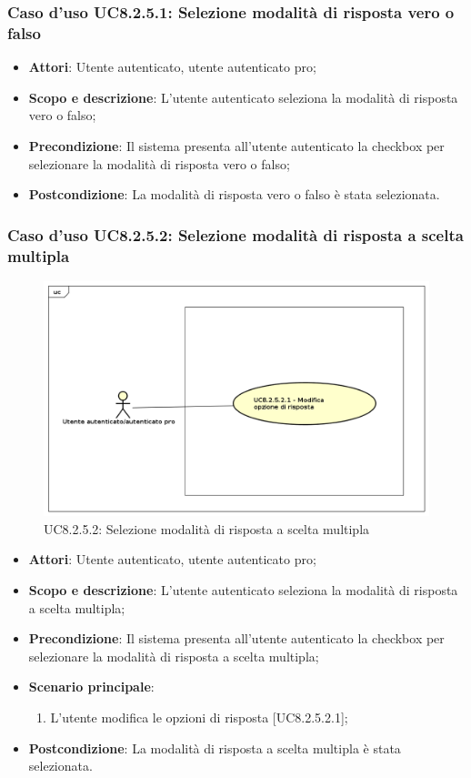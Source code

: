 	\subsubsection{Caso d'uso UC8.2.5.1: Selezione modalità di risposta vero o falso}
	\begin{itemize}
		\item
			\textbf{Attori}: Utente autenticato, utente autenticato pro;
		\item
			\textbf{Scopo e descrizione}: L'utente autenticato seleziona la modalità di risposta vero o falso;
		\item		
			\textbf{Precondizione}: Il sistema presenta all'utente autenticato la checkbox per selezionare la modalità di risposta vero o falso;
		\item
			\textbf{Postcondizione}: La modalità di risposta vero o falso è stata selezionata.
	\end{itemize}
	\subsubsection{Caso d'uso UC8.2.5.2: Selezione modalità di risposta a scelta multipla}
	\label{UC8.2.5.2}
	\begin{figure}[h]
		\centering
			\includegraphics[scale=0.45,keepaspectratio]{UML/UC8_2_5_2.png}
		\caption{UC8.2.5.2: Selezione modalità di risposta a scelta multipla}
	\end{figure}
	\FloatBarrier	
	\begin{itemize}
		\item
			\textbf{Attori}: Utente autenticato, utente autenticato pro;
		\item
			\textbf{Scopo e descrizione}: L'utente autenticato seleziona la modalità di risposta a scelta multipla;
		\item		
			\textbf{Precondizione}: Il sistema presenta all'utente autenticato la checkbox per selezionare la modalità di risposta a scelta multipla;
		\item
			\textbf{Scenario principale}:
				\begin{enumerate}
					\item 	
						L'utente modifica le opzioni di risposta [UC8.2.5.2.1];	
				\end{enumerate}
		\item
			\textbf{Postcondizione}: La modalità di risposta a scelta multipla è stata selezionata.
	\end{itemize}
